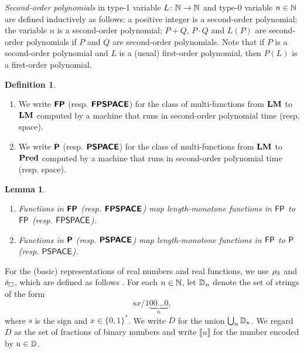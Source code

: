 \documentclass{article}
\newtheorem{lemma}[theorem]{Lemma}
\theoremstyle{definition}
\newtheorem{definition}[theorem]{Definition}
\theoremstyle{remark}
\begin{document}
\emph{Second-order polynomials} in type-1 variable $L \colon \mathbb N \to \mathbb N$
and type-0 variable $n \in \mathbb N$ 
are defined inductively as follows:
a positive integer is a second-order polynomial;
the variable $n$ is a second-order polynomial;
$P+Q$, $P \cdot Q$ and $L(P)$ are
second-order polynomials if $P$ and $Q$ are second-order polynomials.
Note that if $P$ is a second-order polynomial and $L$ is a (usual) first-order
polynomial, then $P(L)$ is a first-order polynomial.

\begin{definition}
\begin{enumerate}
 \item We write $\text{\bfseries \sffamily \upshape FP}$ (resp. $\text{\bfseries \sffamily \upshape FPSPACE}$) for the class of
       multi-functions from $\mathbf{LM}$ to $\mathbf{LM}$ computed by a machine that runs
       in second-order polynomial time (resp. space).
 \item We write $\text{\bfseries \sffamily \upshape P}$ (resp. $\text{\bfseries \sffamily \upshape PSPACE}$) for the class of
       multi-functions from $\mathbf{LM}$ to $\mathbf{Pred}$ computed by a machine that runs
       in second-order polynomial time (resp. space).
\end{enumerate}
\end{definition}

\begin{lemma}
 \begin{enumerate}
  \item Functions in $\text{\bfseries \sffamily \upshape FP}$ (resp. $\text{\bfseries \sffamily \upshape FPSPACE}$) map 
	length-monotone functions in $\mathsf{FP}$ to $\mathsf{FP}$ 
	(resp. $\mathsf{FPSPACE}$).
  \item Functions in $\text{\bfseries \sffamily \upshape P}$ (resp. $\text{\bfseries \sffamily \upshape PSPACE}$) map 
	length-monotone functions in $\mathsf{FP}$ to $\mathsf{P}$
	(resp. $\mathsf{PSPACE}$).
 \end{enumerate}
\end{lemma}





For the (basic) representations of real numbers and real functions,
we use $\rho _\mathbb R$ and $\delta _\square$, 
which are defined as follows \cite{kawamura2012complexity}.
For each $n \in \mathbb N$, let $\mathbb D_n$ denote the set of strings of the form
\begin{equation}
 sx/1\!\underbrace{00\dots0}_{n},
\end{equation}
where $s$ is the sign and $x \in \{0,1\}^*$.
We write $D$ for the union $\bigcup _n \mathbb D _n$.
We regard $D$ as the set of fractions of binary numbers
and write $\llbracket u \rrbracket$ for the number encoded by $u \in \mathbb D$.
\end{document}
